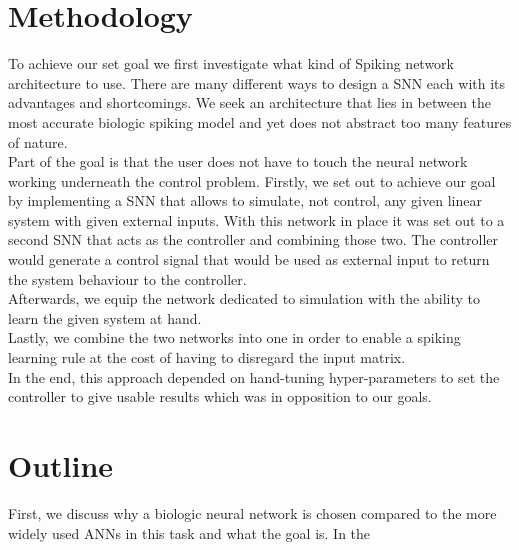 \section{Methodology}
To achieve our set goal we first investigate what kind of Spiking network architecture to use. There are many different ways to design a \ac{SNN} each with its advantages and shortcomings.
We seek an architecture that lies in between the most accurate biologic spiking model and yet does not abstract too many features of nature.\\
Part of the goal is that the user does not have to touch the neural network working underneath the control problem.
Firstly, we set out to achieve our goal by implementing a \ac{SNN} that allows to simulate, not control, any given linear system with given external inputs. With this network in place it was set out to a second \ac{SNN} that acts as the controller and combining those two. The controller would generate a control signal that would be used as external input to return the system behaviour to the controller.\\
Afterwards, we equip the network dedicated to simulation with the ability to learn the given system at hand.\\
Lastly, we combine the two networks into one in order to enable a spiking learning rule at the cost of having to disregard the input matrix.\\

In the end, this approach depended on hand-tuning hyper-parameters to set the controller to give usable results which was in opposition to our goals.\\
\section{Outline}
First, we discuss why a biologic neural network is chosen compared to the more widely used \acp{ANN} in this task and what the goal is. In the